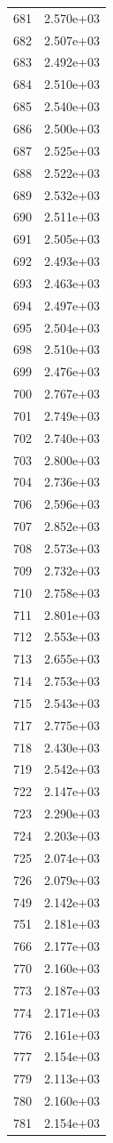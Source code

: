 \documentclass[12pt]{article}
\begin{document}
\begin{longtable}{@{}cc@{}}
681 & 2.570e+03 \\
682 & 2.507e+03 \\
683 & 2.492e+03 \\
684 & 2.510e+03 \\
685 & 2.540e+03 \\
686 & 2.500e+03 \\
687 & 2.525e+03 \\
688 & 2.522e+03 \\
689 & 2.532e+03 \\
690 & 2.511e+03 \\
691 & 2.505e+03 \\
692 & 2.493e+03 \\
693 & 2.463e+03 \\
694 & 2.497e+03 \\
695 & 2.504e+03 \\
698 & 2.510e+03 \\
699 & 2.476e+03 \\
700 & 2.767e+03 \\
701 & 2.749e+03 \\
702 & 2.740e+03 \\
703 & 2.800e+03 \\
704 & 2.736e+03 \\
706 & 2.596e+03 \\
707 & 2.852e+03 \\
708 & 2.573e+03 \\
709 & 2.732e+03 \\
710 & 2.758e+03 \\
711 & 2.801e+03 \\
712 & 2.553e+03 \\
713 & 2.655e+03 \\
714 & 2.753e+03 \\
715 & 2.543e+03 \\
717 & 2.775e+03 \\
718 & 2.430e+03 \\
719 & 2.542e+03 \\
722 & 2.147e+03 \\
723 & 2.290e+03 \\
724 & 2.203e+03 \\
725 & 2.074e+03 \\
726 & 2.079e+03 \\
749 & 2.142e+03 \\
751 & 2.181e+03 \\
766 & 2.177e+03 \\
770 & 2.160e+03 \\
773 & 2.187e+03 \\
774 & 2.171e+03 \\
776 & 2.161e+03 \\
777 & 2.154e+03 \\
779 & 2.113e+03 \\
780 & 2.160e+03 \\
781 & 2.154e+03 \\

\bottomrule
\end{longtable}
\end{document}
